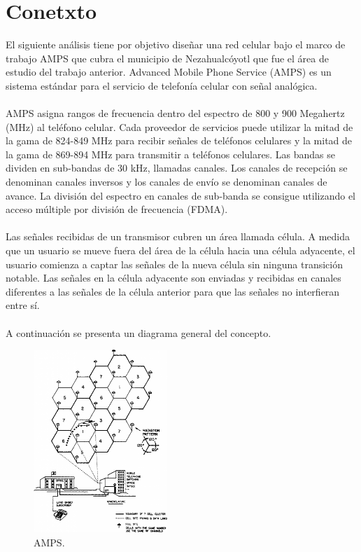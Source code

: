 \documentclass[11pt,letterpaper]{article}
\begin{document}


\newpage
\tableofcontents
\listoffigures
\listoftables

\newpage
\section{Conetxto}
El siguiente análisis tiene por objetivo diseñar una red celular bajo el marco de trabajo AMPS 
que cubra el municipio de Nezahualcóyotl que fue el área de estudio del trabajo anterior. 
Advanced Mobile Phone Service (AMPS) es un sistema estándar para el servicio de telefonía 
celular con señal analógica. 
\\ \\
AMPS asigna rangos de frecuencia dentro del espectro de 800 y 900 Megahertz (MHz) al teléfono 
celular. Cada proveedor de servicios puede utilizar la mitad de la gama de 824-849 MHz para 
recibir señales de teléfonos celulares y la mitad de la gama de 869-894 MHz para transmitir 
a teléfonos celulares. Las bandas se dividen en sub-bandas de 30 kHz, llamadas canales. Los 
canales de recepción se denominan canales inversos y los canales de envío se denominan 
canales de avance. La división del espectro en canales de sub-banda se consigue utilizando 
el acceso múltiple por división de frecuencia (FDMA).
\\ \\
Las señales recibidas de un transmisor cubren un área llamada célula. A medida que un usuario 
se mueve fuera del área de la célula hacia una célula adyacente, el usuario comienza a 
captar las señales de la nueva célula sin ninguna transición notable. Las señales en la 
célula adyacente son enviadas y recibidas en canales diferentes a las señales de la célula 
anterior para que las señales no interfieran entre sí.
\\ \\
A continuación se presenta un diagrama general del concepto.
\begin{figure}[ht]
    \centering
    \includegraphics[width=0.45\textwidth]{imagenes/t20.png}
    \caption{AMPS.}
\end{figure}
\end{document}

